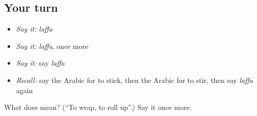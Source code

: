 \subsection*{Your turn}
\begin{itemize}
\raggedright
  \item \emph{Say it:} \emph{laffa}
  \item \emph{Say it:} \emph{laffa}, once more
  \item \emph{Say it:} say \emph{laffa}
  \item \emph{Recall:} say the Arabic for to stick, then the Arabic for to stir, then say \emph{laffa} again
\end{itemize}

\begin{tcolorbox}[breakable,colback=teal!4,colframe=teal!35!black,title={Before you move on}]
What does  mean? (\textquotedblleft{}To wrap, to roll up\textquotedblright{}.) Say it once more.
\end{tcolorbox}
